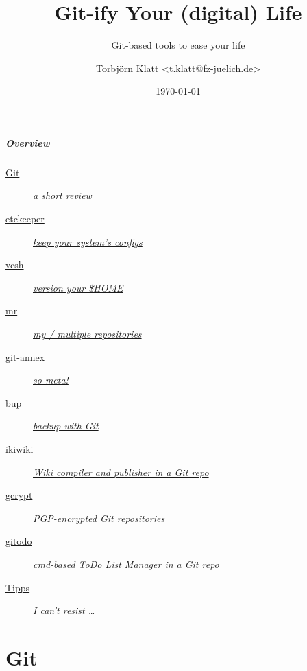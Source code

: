 \documentclass[english,hyperref={pdfpagelabels=false},aspectratio=169]{beamer}
\title{Git-ify Your (digital) Life}
\subtitle{Git-based tools to ease your life}
\author{Torbjörn Klatt <\href{mailto:t.klatt@fz-juelich.de}{t.klatt@fz-juelich.de}>}
\institute{JSC Internal Seminar}
\date{\today}
\begin{document}
\maketitle

\begin{frame}
  \frametitle{Overview}
  \begin{description}
    \item[\hyperlink{git}{Git}] \hyperlink{git}{\textit{a short review}}
    \item[\hyperlink{etckeeper}{etckeeper}] \hyperlink{etckeeper}{\textit{keep your system's configs}}
    \item[\hyperlink{vcsh}{vcsh}] \hyperlink{vcsh}{\textit{version your \$HOME}}
    \item[\hyperlink{mr}{mr}] \hyperlink{mr}{\textit{my / multiple repositories}}
    \item[\hyperlink{gitannex}{git-annex}] \hyperlink{gitannex}{\textit{so meta!}}
    \item[\hyperlink{bup}{bup}] \hyperlink{bup}{\textit{backup with Git}}
    \item[\hyperlink{ikiwiki}{ikiwiki}] \hyperlink{ikiwiki}{\textit{Wiki compiler and publisher in a Git repo}}
    \item[\hyperlink{gcrypt}{gcrypt}] \hyperlink{gcrypt}{\textit{PGP-encrypted Git repositories}}
    \item[\hyperlink{gitodo}{gitodo}] \hyperlink{gitodo}{\textit{cmd-based ToDo List Manager in a Git repo}}
    \item[\hyperlink{tipps}{Tipps}] \hyperlink{tipps}{\textit{I can't resist \dots}}
  \end{description}
\end{frame}


\part{Git}
\makepart
\end{document}
